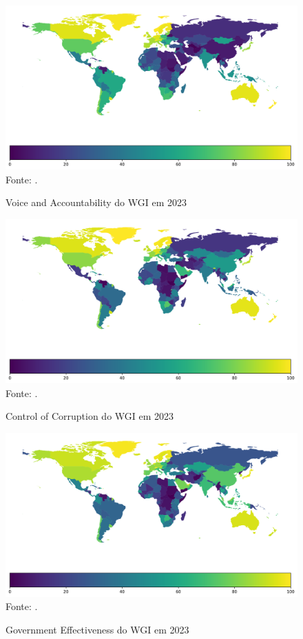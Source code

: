 \begin{figure}[H]
	\centering
	\caption{Voice and Accountability do WGI em 2023}
	\includegraphics[width=1\linewidth]{figuras/mapa_coropletico_wgi_va}
	\label{fig:mapa_coropletico_wgi_va}
	\footnotesize{Fonte: \cite{wgi_dados}.}
\end{figure}

\begin{figure}[H]
	\centering
	\caption{Control of Corruption do WGI em 2023}
	\includegraphics[width=1\linewidth]{figuras/mapa_coropletico_wgi_cc}
	\label{fig:mapa_coropletico_wgi_cc}
	\footnotesize{Fonte: \cite{wgi_dados}.}
\end{figure}

\begin{figure}[H]
	\centering
	\caption{Government Effectiveness do WGI em 2023}
	\includegraphics[width=1\linewidth]{figuras/mapa_coropletico_wgi_ge}
	\label{fig:mapa_coropletico_wgi_ge}
	\footnotesize{Fonte: \cite{wgi_dados}.}
\end{figure}

